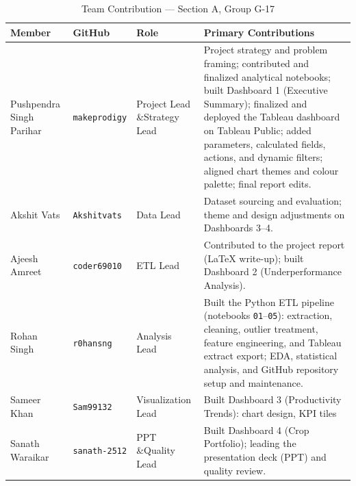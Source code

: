 \documentclass[10pt]{article}
\begin{document}
\begin{table}[H]
  \centering
  \caption{Team Contribution — Section A, Group G-17}
  \label{tab:contrib}
  \footnotesize
  \setlength{\extrarowheight}{2pt}
  \begin{tabularx}{\textwidth}{>{}p{2.6cm} >{}p{2.2cm} >{}p{2.0cm} X}
    \toprule
    \rowcolor{lightgreen}
    \textbf{\color{darkgreen}Member} &
    \textbf{\color{darkgreen}GitHub} &
    \textbf{\color{darkgreen}Role} &
    \textbf{\color{darkgreen}Primary Contributions} \\
    \midrule
    Pushpendra Singh Parihar
      & \texttt{makeprodigy}
      & Project Lead \&\newline Strategy Lead
      & Project strategy and problem framing; contributed and finalized analytical notebooks;
        built Dashboard 1 (Executive Summary); finalized and deployed the Tableau
        dashboard on Tableau Public; added parameters, calculated fields, actions,
        and dynamic filters; aligned chart themes and colour palette; final report edits.
      \\[4pt]
    Akshit Vats
      & \texttt{Akshitvats}
      & Data Lead
      & Dataset sourcing and evaluation; theme and design adjustments
        on Dashboards 3–4.
      \\[4pt]
    Ajeesh Amreet
      & \texttt{coder69010}
      & ETL Lead
      & Contributed to the project report (LaTeX write-up);
        built Dashboard 2 (Underperformance Analysis).
      \\[4pt]
    Rohan Singh
      & \texttt{r0hansng}
      & Analysis Lead
      & Built the Python ETL pipeline (notebooks \texttt{01}–\texttt{05}):
        extraction, cleaning, outlier treatment, feature engineering, and
        Tableau extract export; EDA, statistical analysis, and GitHub
        repository setup and maintenance.
      \\[4pt]
    Sameer Khan
      & \texttt{Sam99132}
      & Visualization Lead
      & Built Dashboard 3 (Productivity Trends): chart design, KPI tiles
      \\[4pt]
    Sanath Waraikar
      & \texttt{sanath-2512}
      & PPT \&\newline Quality Lead
      & Built Dashboard 4 (Crop Portfolio); leading the presentation deck
        (PPT) and quality review.
      \\
    \bottomrule
  \end{tabularx}
\end{table}

\end{document}
